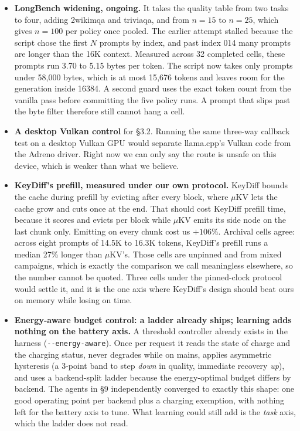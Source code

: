 \documentclass[11pt]{article}
\begin{document}
\begin{itemize}\itemsep1pt\parskip0pt
\item \textbf{LongBench widening, ongoing.} It takes the quality table from two tasks to four,
adding 2wikimqa and triviaqa, and from $n{=}15$ to $n{=}25$, which gives $n{=}100$ per policy
once pooled. The earlier attempt stalled because the script chose the first $N$ prompts by
index, and past index 014 many prompts are longer than the 16K context. Measured across 32
completed cells, these prompts run 3.70 to 5.15 bytes per token. The script now takes only
prompts under 58{,}000 bytes, which is at most 15{,}676 tokens and leaves room for the
generation inside 16384. A second guard uses the exact token count from the vanilla pass before committing the five
policy runs. A prompt that slips past the byte filter therefore still cannot hang a cell.

\item \textbf{A desktop Vulkan control} for \S3.2. Running the same three-way callback test on
a desktop Vulkan GPU would separate llama.cpp's Vulkan code from the Adreno driver. Right now
we can only say the route is unsafe on this device, which is weaker than what we believe.

\item \textbf{KeyDiff's prefill, measured under our own protocol.} KeyDiff bounds the cache
during prefill by evicting after every block, where $\mu$KV lets the cache grow and cuts once
at the end. That should cost KeyDiff prefill time, because it scores and evicts per block
while $\mu$KV emits its side node on the last chunk only. Emitting on every chunk cost us
$+106\%$. Archival cells agree: across eight prompts of 14.5K to 16.3K tokens, KeyDiff's
prefill runs a median 27\% longer than $\mu$KV's. Those cells are unpinned and from mixed
campaigns, which is exactly the comparison we call meaningless elsewhere, so the number cannot
be quoted. Three cells under the pinned-clock protocol would settle it, and it is the one
axis where KeyDiff's design should beat ours on memory while losing on time.

\item \textbf{Energy-aware budget control: a ladder already ships; learning adds nothing on
the battery axis.} A threshold controller already exists in the harness
(\texttt{-{}-energy-aware}). Once per request it reads the state of charge and the charging
status, never degrades while on mains, applies asymmetric hysteresis (a 3-point band to step
\emph{down} in quality, immediate recovery \emph{up}), and uses a backend-split ladder because
the energy-optimal budget differs by backend. The agents in \S9 independently converged to
exactly this shape: one good operating point per backend plus a charging exemption, with
nothing left for the battery axis to tune. What learning could still add is the \emph{task}
axis, which the ladder does not read.


\end{itemize}
\end{document}
